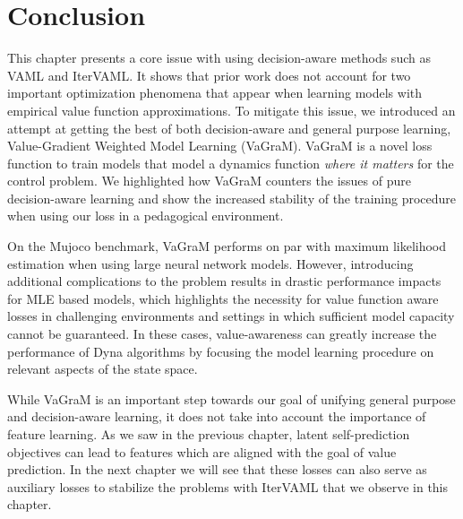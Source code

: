 \section{Conclusion}
This chapter presents a core issue with using decision-aware methods such as VAML and IterVAML.
It shows that prior work does not account for two important optimization phenomena that appear when learning models with empirical value function approximations.
To mitigate this issue, we introduced an attempt at getting the best of both decision-aware and general purpose learning, Value-Gradient Weighted Model Learning (VaGraM).
VaGraM is a novel loss function to train models that model a dynamics function \emph{where it matters} for the control problem.
We highlighted how VaGraM counters the issues of pure decision-aware learning and show the increased stability of the training procedure when using our loss in a pedagogical environment.

On the Mujoco benchmark, VaGraM performs on par with maximum likelihood estimation when using large neural network models.
However, introducing additional complications to the problem results in drastic performance impacts for MLE based models, which highlights the necessity for value function aware losses in challenging environments and settings in which sufficient model capacity cannot be guaranteed.
In these cases, value-awareness can greatly increase the performance of Dyna algorithms by focusing the model learning procedure on relevant aspects of the state space.

While VaGraM is an important step towards our goal of unifying general purpose and decision-aware learning, it does not take into account the importance of feature learning.
As we saw in the previous chapter, latent self-prediction objectives can lead to features which are aligned with the goal of value prediction.
In the next chapter we will see that these losses can also serve as auxiliary losses to stabilize the problems with IterVAML that we observe in this chapter.
